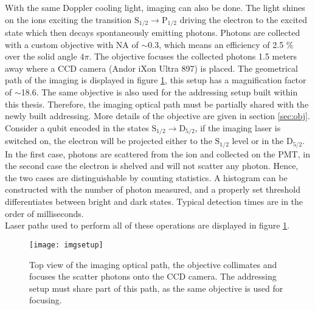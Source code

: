 With the same Doppler cooling light, imaging can also be done. The light shines on the ions exciting the transition $\text{S}_{1/2} \to \text{P}_{1/2}$ driving the electron to the excited state which then decays spontaneously emitting photons. Photons are collected with a custom objective with NA of $\sim 0.3$, which means an efficiency of 2.5 \% over the solid angle $4\pi$. The objective focuses the collected photons 1.5 meters away where a CCD camera (Andor iXon Ultra 897) is placed. The geometrical path of the imaging is displayed in figure \ref{imgsetup}, this setup has a magnification factor of $\sim$18.6. The same objective is also used for the addressing setup built within this thesis. Therefore, the imaging optical path must be partially shared with the newly built addressing. More details of the objective are given in section \ref{sec:obj}.\\
Consider a qubit encoded in the states $\text{S}_{1/2} \to \text{D}_{5/2}$, if the imaging laser is switched on, the electron will be projected either to the $\text{S}_{1/2}$ level or in the $\text{D}_{5/2} $. In the first case, photons are scattered from the ion and collected on the PMT, in the second case the electron is shelved and will not scatter any photon. Hence, the two cases are distinguishable by counting statistics. A histogram can be constructed  with the number of photon measured, and a properly set threshold differentiates between bright and dark states. Typical detection times are in the order of milliseconds.\\
Laser paths used to perform all of these operations are displayed in figure \ref{imgsetup}.

\begin{figure}
\centering
\texttt{[image: imgsetup]}
\caption{Top view of the imaging optical path, the objective collimates and focuses the scatter photons onto the CCD camera. The addressing setup must share part of this path, as the same objective is used for focusing.}
\label{imgsetup}
\end{figure}

